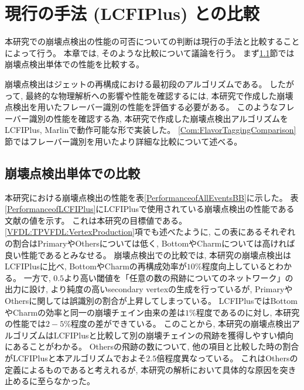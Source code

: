 
\chapter{現行の手法 (LCFIPlus) との比較} \label{chap:Comparison}

本研究での崩壊点検出の性能の可否についての判断は現行の手法と比較することによって行う。
本章では, そのような比較について議論を行う。
まず\ref{Com:ComparisonwithVF}節では崩壊点検出単体での性能を比較する。

崩壊点検出はジェットの再構成における最初段のアルゴリズムである。
したがって, 最終的な物理解析への影響や性能を確認するには, 本研究で作成した崩壊点検出を用いたフレーバー識別の性能を評価する必要がある。
このようなフレーバー識別の性能を確認する為, 本研究で作成した崩壊点検出アルゴリズムをLCFIPlus, Marlinで動作可能な形で実装した。
\ref{Com:FlavorTaggingComparison}節ではフレーバー識別を用いたより詳細な比較について述べる。


\section{崩壊点検出単体での比較} \label{Com:ComparisonwithVF}

本研究における崩壊点検出の性能を表\ref{PerformanceofAllEventsBB}に示した。
表\ref{PerformanceofLCFIPlus}にLCFIPlusで使用されている崩壊点検出の性能である文献\cite{LCFIPlusPaper}の値を示す。
これは本研究の目標値である。
\ref{VFDL:TPVFDL:VertexProduction}項でも述べたように, この表にあるそれぞれの割合はPrimaryやOthersについては低く, BottomやCharmについては高ければ良い性能であるとみなせる。
崩壊点検出での比較では, 本研究の崩壊点検出はLCFIPlusに比べ, BottomやCharmの再構成効率が$10\%$程度向上しているとわかる。
一方で, $0.5$より高い閾値を「任意の数の飛跡についてのネットワーク」の出力に設け, より純度の高いsecondary vertexの生成を行っているが, PrimaryやOthersに関しては誤識別の割合が上昇してしまっている。
LCFIPlusではBottomやCharmの効率と同一の崩壊チェイン由来の差は$1\%$程度であるのに対し, 本研究の性能では$2-5\%$程度の差ができている。
このことから, 本研究の崩壊点検出アルゴリズムはLCFIPlusと比較して別の崩壊チェインの飛跡を獲得しやすい傾向にあることがわかる。
Othersの飛跡の数について, 他の項目と比較した時の割合がLCFIPlusと本アルゴリズムでおよそ$2.5$倍程度異なっている。
これはOthersの定義によるものであると考えれるが, 本研究の解析において具体的な原因を突き止めるに至らなかった。\\

